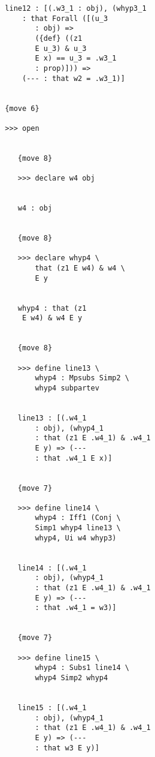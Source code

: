 \documentclass[12pt]{article}
\begin{document}
\begin{verbatim}
                     line12 : [(.w3_1 : obj), (whyp3_1 
                         : that Forall ([(u_3 
                            : obj) => 
                            ({def} ((z1 
                            E u_3) & u_3 
                            E x) == u_3 = .w3_1 
                            : prop)])) => 
                         (--- : that w2 = .w3_1)]


                     {move 6}

                     >>> open


                        {move 8}

                        >>> declare w4 obj


                        w4 : obj


                        {move 8}

                        >>> declare whyp4 \
                            that (z1 E w4) & w4 \
                            E y


                        whyp4 : that (z1 
                         E w4) & w4 E y


                        {move 8}

                        >>> define line13 \
                            whyp4 : Mpsubs Simp2 \
                            whyp4 subpartev


                        line13 : [(.w4_1 
                            : obj), (whyp4_1 
                            : that (z1 E .w4_1) & .w4_1 
                            E y) => (--- 
                            : that .w4_1 E x)]


                        {move 7}

                        >>> define line14 \
                            whyp4 : Iff1 (Conj \
                            Simp1 whyp4 line13 \
                            whyp4, Ui w4 whyp3)


                        line14 : [(.w4_1 
                            : obj), (whyp4_1 
                            : that (z1 E .w4_1) & .w4_1 
                            E y) => (--- 
                            : that .w4_1 = w3)]


                        {move 7}

                        >>> define line15 \
                            whyp4 : Subs1 line14 \
                            whyp4 Simp2 whyp4


                        line15 : [(.w4_1 
                            : obj), (whyp4_1 
                            : that (z1 E .w4_1) & .w4_1 
                            E y) => (--- 
                            : that w3 E y)]



\end{verbatim}
\end{document}
